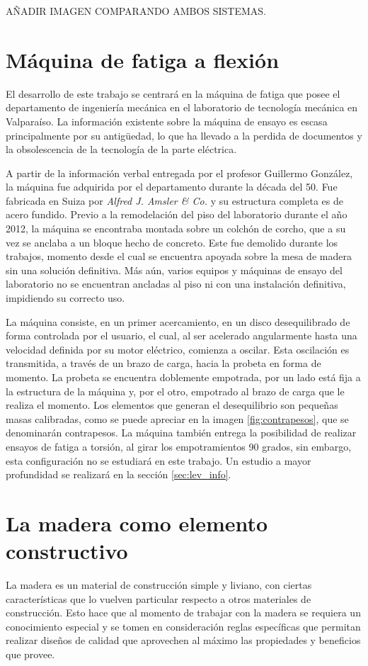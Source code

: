 AÑADIR IMAGEN COMPARANDO AMBOS SISTEMAS.

\section{Máquina de fatiga a flexión}
El desarrollo de este trabajo se centrará en la máquina de fatiga que posee el departamento de ingeniería mecánica en el laboratorio de tecnología mecánica en Valparaíso. La información existente sobre la máquina de ensayo es escasa principalmente por su antigüedad, lo que ha llevado a la perdida de documentos y la obsolescencia de la tecnología de la parte eléctrica.  

A partir de la información verbal entregada por el profesor Guillermo González, la máquina fue adquirida por el departamento durante la década del 50. Fue fabricada en Suiza por \textit{Alfred J. Amsler \& Co.} y su estructura completa es de acero fundido. Previo a la remodelación del piso del laboratorio durante el año 2012, la máquina se encontraba montada sobre un colchón de corcho, que a su vez se anclaba a un bloque hecho de concreto. Este fue demolido durante los trabajos, momento desde el cual se encuentra apoyada sobre la mesa de madera sin una solución definitiva. Más aún, varios equipos y máquinas de ensayo del laboratorio no se encuentran ancladas al piso ni con una instalación definitiva, impidiendo su correcto uso.

La máquina consiste, en un primer acercamiento, en un disco desequilibrado de forma controlada por el usuario, el cual, al ser acelerado angularmente hasta una velocidad definida por su motor eléctrico, comienza a oscilar. Esta oscilación es transmitida, a través de un brazo de carga, hacia la probeta en forma de momento. La probeta se encuentra doblemente empotrada, por un lado está fija a la estructura de la máquina y, por el otro, empotrado al brazo de carga que le realiza el momento. Los elementos que generan el desequilibrio son pequeñas masas calibradas, como se puede apreciar en la imagen \ref{fig:contrapesos}, que se denominarán contrapesos. La máquina también entrega la posibilidad de realizar ensayos de fatiga a torsión, al girar los empotramientos 90 grados, sin embargo, esta configuración no se estudiará en este trabajo. Un estudio a mayor profundidad se realizará en la sección \ref{sec:lev_info}.

\section{La madera como elemento constructivo}
La madera es un material de construcción simple y liviano, con ciertas características que lo vuelven particular respecto a otros materiales de construcción. Esto hace que al momento de trabajar con la madera se requiera un conocimiento especial y se tomen en consideración reglas específicas que permitan realizar diseños de calidad que aprovechen al máximo las propiedades y beneficios que provee.

